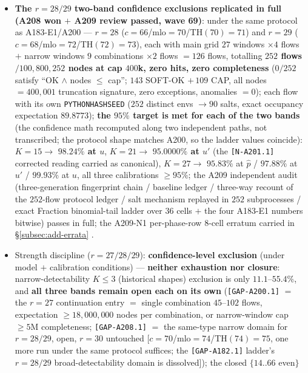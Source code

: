 \begin{itemize}
(A201 independent three-item audit holds bitwise; the $K=21$ exact boundary
is corrected to \textbf{$95.0000\%$}, see \S\ref{subsec:add-errata})
.
\item \textbf{The $r=28/29$ two-band confidence exclusions replicated in
full (A208 won $+$ A209 review passed, wave 69)}: under the same protocol as
A183-E1/A200 --- $r=28$ ($c=66$/mlo$=70$/TH$(70)=71$) and $r=29$
($c=68$/mlo$=72$/TH$(72)=73$), each with main grid $27$ windows $\times4$
flows $+$ narrow windows $9$ combinations $\times2$ flows $=126$ flows,
totalling \textbf{$252$ flows$/100{,}800{,}252$ nodes at cap $400$k, zero
hits, zero completeness} ($0/252$ satisfy ``OK $\wedge$ nodes $\le$ cap'';
$143$ SOFT-OK $+\,109$ CAP, all nodes$=400{,}001$ truncation signature, zero
exceptions, anomalies $=0$); each flow with its own \texttt{PYTHONHASHSEED}
($252$ distinct envs $\to90$ salts, exact occupancy expectation $89.8773$);
\textbf{the $95\%$ target is met for each of the two bands} (the confidence
math recomputed along two independent paths, not transcribed; the protocol
shape matches A200, so the ladder values coincide): $K=15\to$
\textbf{$98.24\%$ at $u$}, $K=21\to$ \textbf{$95.0000\%$ at $u'$} (the
\texttt{[N-A201.1]} corrected reading carried as canonical), $K=27\to$
$95.83\%$ at $\hat p$ / $97.88\%$ at $u'$ / $99.93\%$ at $u$, all three
calibrations $\ge95\%$; the A209 independent audit (three-generation
fingerprint chain / baseline ledger / three-way recount of the $252$-flow
protocol ledger / salt mechanism replayed in $252$ subprocesses / exact
Fraction binomial-tail ladder over $36$ cells $+$ the four A183-E1 numbers
bitwise) passes in full; the A209-N1 per-phase-row $8$-cell erratum carried
in \S\ref{subsec:add-errata} .
\item Strength discipline ($r=27/28/29$): \textbf{confidence-level
exclusion} (under model $+$ calibration conditions) --- \textbf{neither
exhaustion nor closure}: narrow-detectability $K\le3$ (historical shapes)
exclusion is only $11.1$--$55.4\%$, and \textbf{all three bands remain open
each on its own} (\texttt{[GAP-A200.1]} $=$ the $r=27$ continuation entry
$=$ single combination $45$--$102$ flows, expectation $\ge18{,}000{,}000$
nodes per combination, or narrow-window cap $\ge5$M completeness;
\texttt{[GAP-A208.1]} $=$ the same-type narrow domain for $r=28/29$, open,
$r=30$ untouched [$c=70$/mlo$=74$/TH$(74)=75$, one more run under the same
protocol suffices; the \texttt{[GAP-A182.1]} ladder's $r=28/29$
broad-detectability domain is dissolved]); the closed $\{14..66$ even$\}$

\end{itemize}
